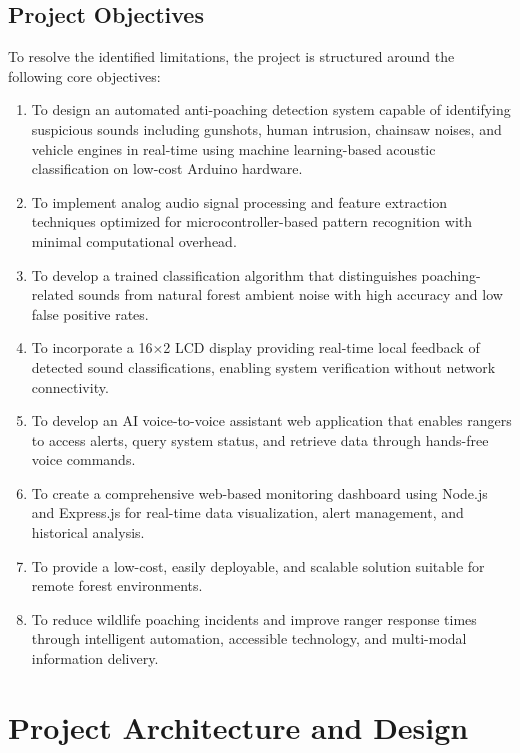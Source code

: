 \documentclass[11pt,a4paper,oneside]{report}
\begin{document}
\section{Project Objectives}
To resolve the identified limitations, the project is structured around the following core objectives:
\begin{enumerate}
    \item To design an automated anti-poaching detection system capable of identifying suspicious sounds including gunshots, human intrusion, chainsaw noises, and vehicle engines in real-time using machine learning-based acoustic classification on low-cost Arduino hardware.
    \item To implement analog audio signal processing and feature extraction techniques optimized for microcontroller-based pattern recognition with minimal computational overhead.
    \item To develop a trained classification algorithm that distinguishes poaching-related sounds from natural forest ambient noise with high accuracy and low false positive rates.
    \item To incorporate a 16$\times$2 LCD display providing real-time local feedback of detected sound classifications, enabling system verification without network connectivity.
    \item To develop an AI voice-to-voice assistant web application that enables rangers to access alerts, query system status, and retrieve data through hands-free voice commands.
    \item To create a comprehensive web-based monitoring dashboard using Node.js and Express.js for real-time data visualization, alert management, and historical analysis.
    \item To provide a low-cost, easily deployable, and scalable solution suitable for remote forest environments.
    \item To reduce wildlife poaching incidents and improve ranger response times through intelligent automation, accessible technology, and multi-modal information delivery.
\end{enumerate}


\chapter{Project Architecture and Design}
\end{document}
